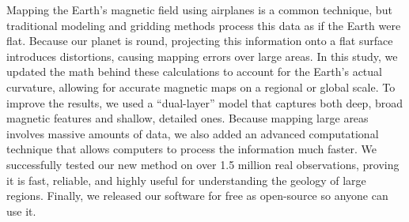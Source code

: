 Mapping the Earth's magnetic field using airplanes is a common 
technique, but traditional modeling and gridding methods process this data as if the Earth were flat. 
Because our planet is round, projecting this information onto a flat surface 
introduces distortions, causing mapping errors over large areas. In this study, 
we updated the math behind these calculations to account for the Earth's actual 
curvature, allowing for accurate magnetic maps on a regional or global scale. 
To improve the results, we used a ``dual-layer'' model that captures both 
deep, broad magnetic features and shallow, detailed ones. Because mapping 
large areas involves massive amounts of data, we also added an advanced 
computational technique that allows computers to process the information much 
faster. We successfully tested our new method on over 1.5 million real 
observations, proving it is fast, reliable, and highly useful for 
understanding the geology of large regions. Finally, we released our software 
for free as open-source so anyone can use it.